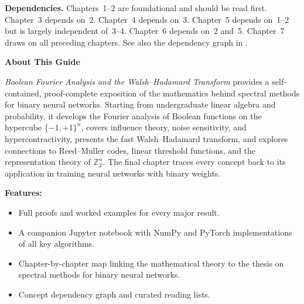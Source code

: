 \documentclass[12pt,a4paper]{report}
\theoremstyle{plain}
\theoremstyle{definition}
\theoremstyle{remark}
\begin{document}
\noindent
\textbf{Dependencies.} Chapters~1--2 are foundational and should be
read first. Chapter~3 depends on~2. Chapter~4 depends on~3.
Chapter~5 depends on~1--2 but is largely independent of~3--4.
Chapter~6 depends on~2 and~5. Chapter~7 draws on all preceding chapters.
See also the dependency graph in .

\newpage












\cleardoublepage
{}
\printindex


\cleardoublepage
\thispagestyle{empty}
\vspace*{\fill}

\begin{center}
{\Large\bfseries About This Guide}
\end{center}

\vspace{0.8cm}

\noindent
\textit{Boolean Fourier Analysis and the Walsh--Hadamard Transform}
provides a self-contained, proof-complete exposition of the mathematics
behind spectral methods for binary neural networks. Starting from
undergraduate linear algebra and probability, it develops the Fourier
analysis of Boolean functions on the hypercube $\{-1,+1\}^n$, covers
influence theory, noise sensitivity, and hypercontractivity, presents the
fast Walsh--Hadamard transform, and explores connections to Reed--Muller
codes, linear threshold functions, and the representation theory of
$\mathbb{Z}_2^n$. The final chapter traces every concept back to its
application in training neural networks with binary weights.

\vspace{0.5cm}

\noindent
\textbf{Features:}
\begin{itemize}[nosep,leftmargin=1.2em]
  \item Full proofs and worked examples for every major result.
  \item A companion Jupyter notebook with NumPy and PyTorch
    implementations of all key algorithms.
  \item Chapter-by-chapter map linking the mathematical theory to the
    thesis on spectral methods for binary neural networks.
  \item Concept dependency graph and curated reading lists.
\end{itemize}
\end{document}
